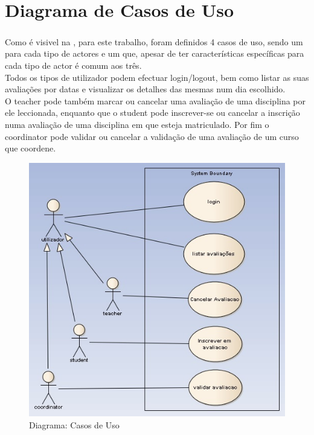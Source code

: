 \chapter{Diagrama de Casos de Uso}

\paragraph{}

Como é visivel na , para este trabalho, foram definidos 4 casos de uso, sendo um para cada tipo de actores e um que, apesar de ter características específicas para cada tipo de actor é comum aos três.\\
Todos os tipos de utilizador podem efectuar login/logout, bem como listar as suas avaliações por datas e visualizar os detalhes das mesmas num dia escolhido.\\
O teacher pode também marcar ou cancelar uma avaliação de uma disciplina por ele leccionada, enquanto que o student pode inscrever-se ou cancelar a inscrição numa avaliação de uma disciplina em que esteja matriculado. Por fim o coordinator pode validar ou cancelar a validação de uma avaliação de um curso que coordene.

\begin{figure}[!htbp]
\centering
\includegraphics{imagens/casos_de_uso.jpg}
\caption{Diagrama: Casos de Uso}
\label{fig:casos_de_uso}
\end{figure}